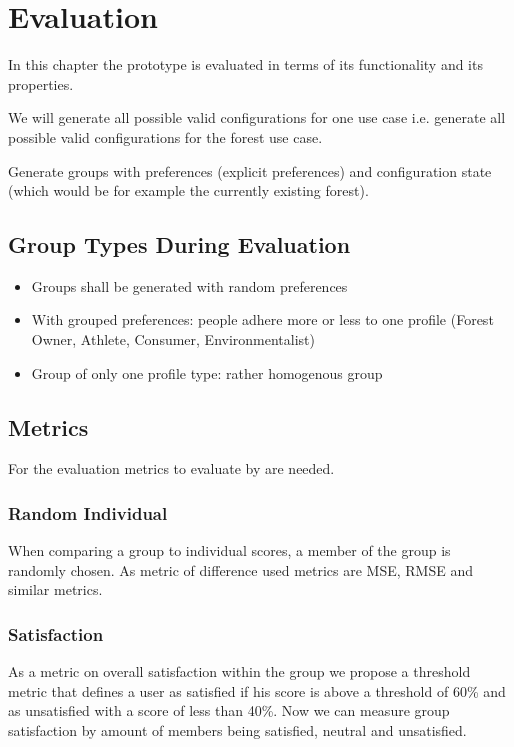 \chapter{Evaluation}
\label{ch:Evaluation}

In this chapter the prototype is evaluated in terms of its functionality and its properties.

We will generate all possible valid configurations for one use case i.e. generate all possible valid configurations for the forest use case.

Generate groups with preferences (explicit preferences) and configuration state (which would be for example the currently existing forest).

\section{Group Types During Evaluation}
\label{sec:Evaluation:GroupTypes}

\begin{itemize}
    \item Groups shall be generated with random preferences
    \item With grouped preferences: people adhere more or less to one profile (Forest Owner, Athlete, Consumer, Environmentalist)
    \item Group of only one profile type: rather homogenous group
\end{itemize}

\section{Metrics}
For the evaluation metrics to evaluate by are needed. 

\label{sec:Evaluation:Metrics}

\subsection{Random Individual}
When comparing a group to individual scores, a member of the group is randomly chosen. As metric of difference used metrics are MSE, RMSE and similar metrics.

\subsection{Satisfaction}
As a metric on overall satisfaction within the group we propose a threshold metric that defines a user as satisfied if his score is above a threshold of 60\% and as unsatisfied with a score of less than 40\%. Now we can measure group satisfaction by amount of members being satisfied, neutral and unsatisfied.

